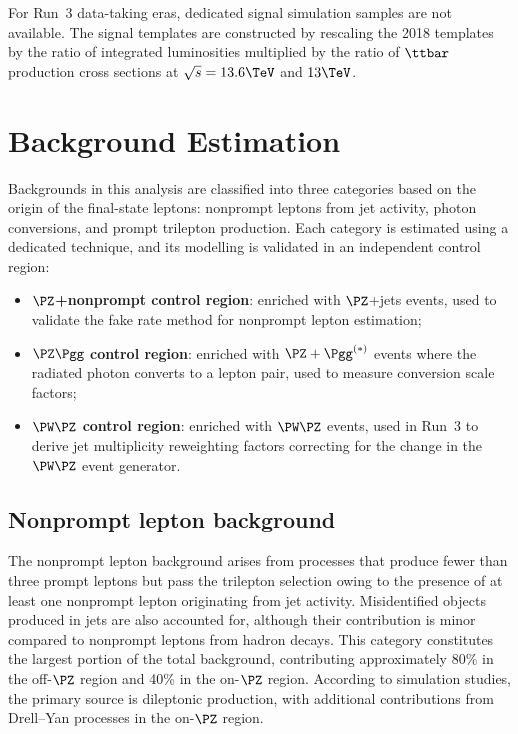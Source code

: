 For Run~3 data-taking eras, dedicated signal simulation samples are not available. The signal templates are constructed by rescaling the 2018 templates by the ratio of integrated luminosities multiplied by the ratio of $\ttbar$ production cross sections at $\sqrt{s} = 13.6\TeV$ and $13\TeV$.

\section{Background Estimation}
\label{sec:background}

Backgrounds in this analysis are classified into three categories based on the origin of the final-state leptons: nonprompt leptons from jet activity, photon conversions, and prompt trilepton production. Each category is estimated using a dedicated technique, and its modelling is validated in an independent control region:
\begin{itemize}
  \item \textbf{$\PZ$+nonprompt control region}: enriched with $\PZ$+jets events, used to validate the fake rate method for nonprompt lepton estimation;
  \item \textbf{$\PZ\Pgg$ control region}: enriched with $\PZ+\Pgg^{(*)}$ events where the radiated photon converts to a lepton pair, used to measure conversion scale factors;
  \item \textbf{$\PW\PZ$ control region}: enriched with $\PW\PZ$ events, used in Run~3 to derive jet multiplicity reweighting factors correcting for the change in the $\PW\PZ$ event generator.
\end{itemize}

\subsection{Nonprompt lepton background}
\label{ssec:nonprompt}

The nonprompt lepton background arises from processes that produce fewer than three prompt leptons but pass the trilepton selection owing to the presence of at least one nonprompt lepton originating from jet activity. Misidentified objects produced in jets are also accounted for, although their contribution is minor compared to nonprompt leptons from hadron decays. This category constitutes the largest portion of the total background, contributing approximately 80\% in the off-$\PZ$ region and 40\% in the on-$\PZ$ region. According to simulation studies, the primary source is dileptonic \ttbar production, with additional contributions from Drell--Yan processes in the on-$\PZ$ region.

